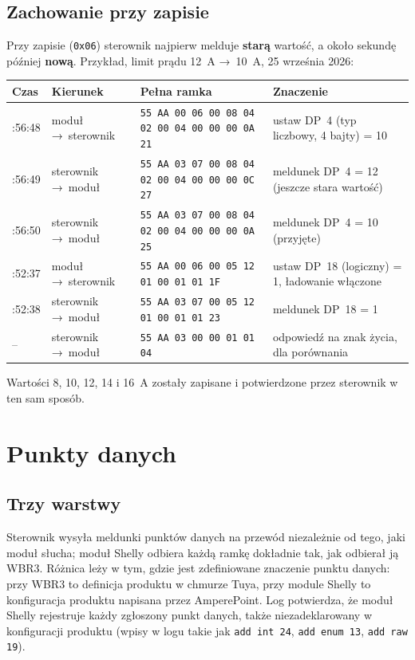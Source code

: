 \documentclass[11pt,a4paper]{article}
\newcommand{\ra}{{\symbolfont →}}
\newcommand{\hx}[1]{\texttt{#1}}
\begin{document}
\subsection{Zachowanie przy zapisie}

Przy zapisie (\hx{0x06}) sterownik najpierw melduje \textbf{starą} wartość, a około sekundę później \textbf{nową}. Przykład, limit prądu 12~A \ra\ 10~A, 25 września 2026:

\begin{longtable}{>{\raggedright\arraybackslash}p{1.6cm}>{\raggedright\arraybackslash}p{2.5cm}>{\raggedright\arraybackslash}p{6.3cm}>{\raggedright\arraybackslash}p{5.4cm}}
\toprule
\rowcolor{aphead}\textbf{Czas} & \textbf{Kierunek} & \textbf{Pełna ramka} & \textbf{Znaczenie} \\
\midrule\endhead
\bottomrule\endfoot
11:56:48 & moduł \ra\ sterownik & \hx{55 AA 00 06 00 08 04 02 00 04 00 00 00 0A 21} & ustaw DP~4 (typ liczbowy, 4 bajty) = 10 \\
11:56:49 & sterownik \ra\ moduł & \hx{55 AA 03 07 00 08 04 02 00 04 00 00 00 0C 27} & meldunek DP~4 = 12 (jeszcze stara wartość) \\
11:56:50 & sterownik \ra\ moduł & \hx{55 AA 03 07 00 08 04 02 00 04 00 00 00 0A 25} & meldunek DP~4 = 10 (przyjęte) \\
10:52:37 & moduł \ra\ sterownik & \hx{55 AA 00 06 00 05 12 01 00 01 01 1F} & ustaw DP~18 (logiczny) = 1, ładowanie włączone \\
10:52:38 & sterownik \ra\ moduł & \hx{55 AA 03 07 00 05 12 01 00 01 01 23} & meldunek DP~18 = 1 \\
-- & sterownik \ra\ moduł & \hx{55 AA 03 00 00 01 01 04} & odpowiedź na znak życia, dla porównania \\
\end{longtable}

Wartości 8, 10, 12, 14 i 16~A zostały zapisane i potwierdzone przez sterownik w ten sam sposób.

\section{Punkty danych}

\subsection{Trzy warstwy}

Sterownik wysyła meldunki punktów danych na przewód niezależnie od tego, jaki moduł słucha; moduł Shelly odbiera każdą ramkę dokładnie tak, jak odbierał ją WBR3. Różnica leży w tym, gdzie jest zdefiniowane znaczenie punktu danych: przy WBR3 to definicja produktu w chmurze Tuya, przy module Shelly to konfiguracja produktu napisana przez AmperePoint. Log potwierdza, że moduł Shelly rejestruje każdy zgłoszony punkt danych, także niezadeklarowany w konfiguracji produktu (wpisy w logu takie jak \texttt{add int 24}, \texttt{add enum 13}, \texttt{add raw 19}).
\end{document}
